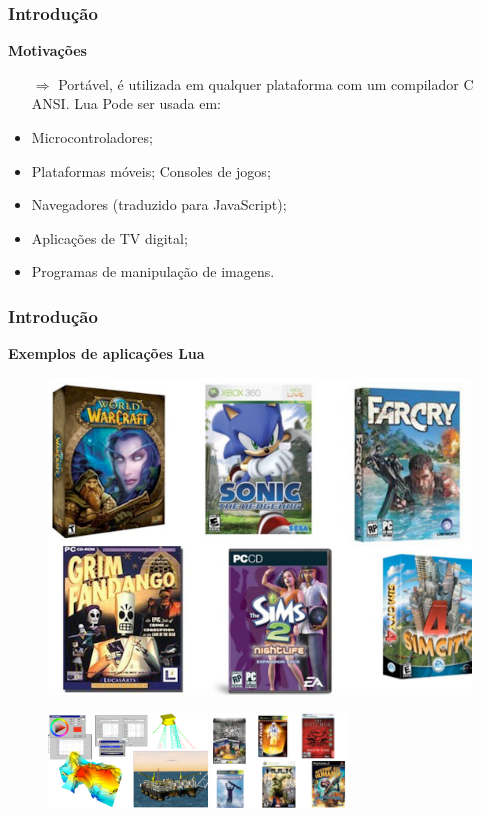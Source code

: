 \documentclass{beamer}
\begin{document}
\begin{frame}[fragile]
	\frametitle{Introdução}
	{\bf Motivações}\vspace{0.4cm}
	\begin{itemize}
		\item[$\Rightarrow$] Portável, é utilizada em qualquer plataforma com um compilador C ANSI. Lua Pode ser usada em:
		\pause
		\item Microcontroladores; 
		\item Plataformas móveis;
		Consoles de jogos;
		\item Navegadores (traduzido para JavaScript);
		\item Aplicações de TV digital;
		\item Programas de manipulação de imagens.
	\end{itemize}
\end{frame}

\begin{frame}[fragile]
	\frametitle{Introdução}
	{\bf Exemplos de aplicações Lua}\vspace{0.4cm}
		\begin{figure}[!htb]
		\centering
		\includegraphics[width=0.4\linewidth]{imagens/exemplo2}
		\end{figure}

		\begin{figure}[!htb]
			\centering
			\includegraphics[height=2.5cm]{imagens/exemplo3}
			\label{figdroopy}
			\quad %
			\includegraphics[height=2.5cm]{imagens/exemplo1}
			\label{figsnoop}
			\label{fig01}
		\end{figure}
\end{frame}
\end{document}
